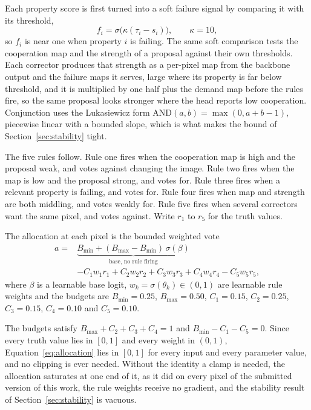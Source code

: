 Each property score is first turned into a soft failure signal by comparing it with its threshold,
\begin{equation}
f_i = \sigma\big(\kappa (\tau_i - s_i)\big), \qquad \kappa = 10 ,
\label{eq:soft_failure}
\end{equation}
so $f_i$ is near one when property $i$ is failing. The same soft comparison tests the cooperation map
and the strength of a proposal against their own thresholds. Each corrector produces that strength as
a per-pixel map from the backbone output and the failure maps it serves, large where its property is
far below threshold, and it is multiplied by one half plus the demand map before the rules fire, so
the same proposal looks stronger where the head reports low cooperation. Conjunction uses the
Lukasiewicz form $\mathrm{AND}(a,b) = \max(0, a + b - 1)$, piecewise linear with a bounded slope,
which is what makes the bound of Section~\ref{sec:stability} tight.

The five rules follow. Rule one fires when the cooperation map is high and the proposal weak, and
votes against changing the image. Rule two fires when the map is low and the proposal strong, and
votes for. Rule three fires when a relevant property is failing, and votes for. Rule four fires when
map and strength are both middling, and votes weakly for. Rule five fires when several correctors
want the same pixel, and votes against. Write $r_1$ to $r_5$ for the truth values.

The allocation at each pixel is the bounded weighted vote
\begin{equation}
\begin{aligned}
a ={}& \underbrace{B_{\min} + (B_{\max} - B_{\min})\,\sigma(\beta)}_{\text{base, no rule firing}} \\
    &- C_1 w_1 r_1 + C_2 w_2 r_2 + C_3 w_3 r_3 + C_4 w_4 r_4 - C_5 w_5 r_5 ,
\end{aligned}
\label{eq:allocation}
\end{equation}
where $\beta$ is a learnable base logit, $w_k = \sigma(\theta_k) \in (0,1)$ are learnable rule weights
and the budgets are $B_{\min} = 0.25$, $B_{\max} = 0.50$, $C_1 = 0.15$, $C_2 = 0.25$, $C_3 = 0.15$,
$C_4 = 0.10$ and $C_5 = 0.10$.

The budgets satisfy $B_{\max} + C_2 + C_3 + C_4 = 1$ and $B_{\min} - C_1 - C_5 = 0$. Since every
truth value lies in $[0,1]$ and every weight in $(0,1)$, Equation~\eqref{eq:allocation} lies in
$[0,1]$ for every input and every parameter value, and no clipping is ever needed. Without the
identity a clamp is needed, the allocation saturates at one end of it, as it did on every pixel of
the submitted version of this work, the rule weights receive no gradient, and the stability result of
Section~\ref{sec:stability} is vacuous.
\label{sec:allocation_defect}
